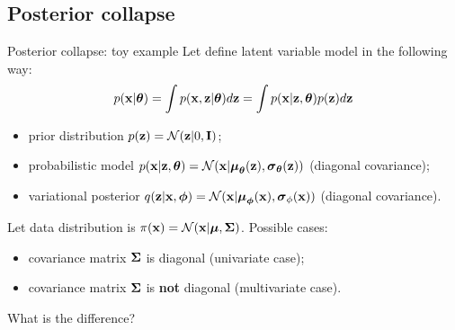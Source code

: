 \subsection{Posterior collapse}
\begin{frame}{Posterior collapse: toy example}
	Let define latent variable model in the following way:
	\[
	p(\mathbf{x} | \boldsymbol{\theta}) = \int p(\mathbf{x}, \mathbf{z} | \boldsymbol{\theta}) d \mathbf{z} = \int p(\mathbf{x} | \mathbf{z}, \boldsymbol{\theta}) p(\mathbf{z}) d \mathbf{z} 
	\]
	\begin{itemize}
		\item prior distribution $p(\mathbf{z}) = \mathcal{N}(\mathbf{z}| 0, \mathbf{I})$;
		\item probabilistic model $p(\mathbf{x} | \mathbf{z}, \boldsymbol{\theta}) = \mathcal{N}(\mathbf{x} | \boldsymbol{\mu}_{\boldsymbol{\theta}}(\mathbf{z}), \boldsymbol{\sigma}_{\boldsymbol{\theta}}(\mathbf{z}))$ (diagonal covariance);
		\item variational posterior $q(\mathbf{z} | \mathbf{x}, \boldsymbol{\phi}) =  \mathcal{N}(\mathbf{x} | \boldsymbol{\mu}_{\boldsymbol{\phi}}(\mathbf{x}), \boldsymbol{\sigma}_{\phi}(\mathbf{x}))$  (diagonal covariance).
	\end{itemize}
	
	Let data distribution is $\pi(\mathbf{x}) = \mathcal{N}(\mathbf{x} | \boldsymbol{\mu}, \boldsymbol{\Sigma})$. Possible cases:
	\begin{itemize}
		\item covariance matrix $\boldsymbol{\Sigma}$ is diagonal (univariate case);
		\item covariance matrix $\boldsymbol{\Sigma}$ is \textbf{not} diagonal (multivariate case).
	\end{itemize}
	What is the difference?
\end{frame}
